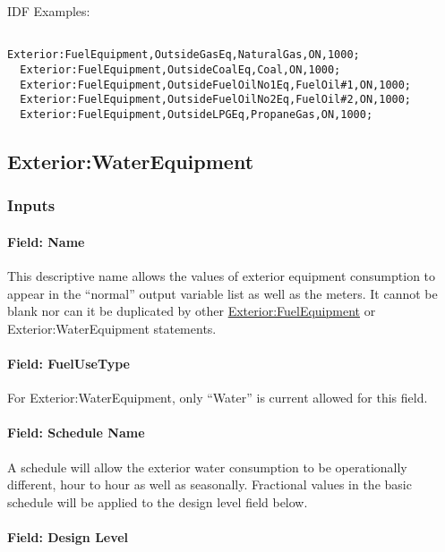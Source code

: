 IDF Examples:

\begin{lstlisting}

Exterior:FuelEquipment,OutsideGasEq,NaturalGas,ON,1000;
  Exterior:FuelEquipment,OutsideCoalEq,Coal,ON,1000;
  Exterior:FuelEquipment,OutsideFuelOilNo1Eq,FuelOil#1,ON,1000;
  Exterior:FuelEquipment,OutsideFuelOilNo2Eq,FuelOil#2,ON,1000;
  Exterior:FuelEquipment,OutsideLPGEq,PropaneGas,ON,1000;
\end{lstlisting}

\subsection{Exterior:WaterEquipment}\label{exteriorwaterequipment}

\subsubsection{Inputs}\label{inputs-2-014}

\paragraph{Field: Name}\label{field-name-2-013}

This descriptive name allows the values of exterior equipment consumption to appear in the ``normal'' output variable list as well as the meters. It cannot be blank nor can it be duplicated by other \hyperref[exteriorfuelequipment]{Exterior:FuelEquipment} or Exterior:WaterEquipment statements.

\paragraph{Field: FuelUseType}\label{field-fuelusetype}

For Exterior:WaterEquipment, only ``Water'' is current allowed for this field.

\paragraph{Field: Schedule Name}\label{field-schedule-name-2-000}

A schedule will allow the exterior water consumption to be operationally different, hour to hour as well as seasonally. Fractional values in the basic schedule will be applied to the design level field below.

\paragraph{Field: Design Level}\label{field-design-level-2}

